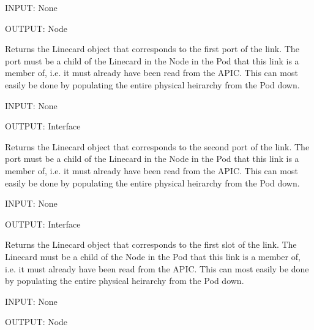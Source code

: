 \documentclass[letterpaper,10pt,english]{sphinxmanual}
\begin{document}
\begin{fulllineitems}
\begin{fulllineitems}
INPUT: None

OUTPUT: Node

\end{fulllineitems}


\begin{fulllineitems}
\label{aciphysobject:aciphysobject.Link.get_port1}
Returns the Linecard object that corresponds to the first port of the link.  The port must be a child of
the Linecard in the Node in the Pod that this link is a member of, i.e. it must already have been read from the APIC.  This can
most easily be done by populating the entire physical heirarchy from the Pod down.

INPUT: None

OUTPUT: Interface

\end{fulllineitems}


\begin{fulllineitems}
\label{aciphysobject:aciphysobject.Link.get_port2}
Returns the Linecard object that corresponds to the second port of the link.  The port must be a child of
the Linecard in the Node in the Pod that this link is a member of, i.e. it must already have been read from the APIC.  This can
most easily be done by populating the entire physical heirarchy from the Pod down.

INPUT: None

OUTPUT: Interface

\end{fulllineitems}


\begin{fulllineitems}
\label{aciphysobject:aciphysobject.Link.get_slot1}
Returns the Linecard object that corresponds to the first slot of the link.  The Linecard must be a child of
the Node in the Pod that this link is a member of, i.e. it must already have been read from the APIC.  This can
most easily be done by populating the entire physical heirarchy from the Pod down.

INPUT: None

OUTPUT: Node

\end{fulllineitems}


\end{fulllineitems}
\end{document}
